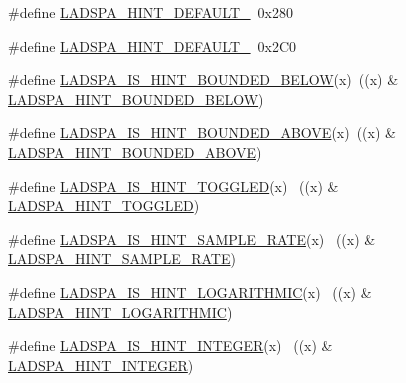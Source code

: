 \begin{DoxyCompactItemize}
\item 
\#define \hyperlink{win_2_l_a_d_s_p_a__plugins-win_2ladspa_8h_a0d369ce1f3e504c88a0160663a4e5e87}{L\+A\+D\+S\+P\+A\+\_\+\+H\+I\+N\+T\+\_\+\+D\+E\+F\+A\+U\+L\+T\+\_}~0x280
\item 
\#define \hyperlink{win_2_l_a_d_s_p_a__plugins-win_2ladspa_8h_a1aacf1e10f40b264ea253daee1fc4620}{L\+A\+D\+S\+P\+A\+\_\+\+H\+I\+N\+T\+\_\+\+D\+E\+F\+A\+U\+L\+T\+\_}~0x2\+C0
\item 
\#define \hyperlink{win_2_l_a_d_s_p_a__plugins-win_2ladspa_8h_a0e4a32c4e05f69be7e3d12e31b027a96}{L\+A\+D\+S\+P\+A\+\_\+\+I\+S\+\_\+\+H\+I\+N\+T\+\_\+\+B\+O\+U\+N\+D\+E\+D\+\_\+\+B\+E\+L\+OW}(x)~((x) \& \hyperlink{win_2_l_a_d_s_p_a__plugins-win_2ladspa_8h_af8ca1d953bcce70b7ccd6a7309486e16}{L\+A\+D\+S\+P\+A\+\_\+\+H\+I\+N\+T\+\_\+\+B\+O\+U\+N\+D\+E\+D\+\_\+\+B\+E\+L\+OW})
\item 
\#define \hyperlink{win_2_l_a_d_s_p_a__plugins-win_2ladspa_8h_a3296617ad301d15ef581ab3f388d9817}{L\+A\+D\+S\+P\+A\+\_\+\+I\+S\+\_\+\+H\+I\+N\+T\+\_\+\+B\+O\+U\+N\+D\+E\+D\+\_\+\+A\+B\+O\+VE}(x)~((x) \& \hyperlink{win_2_l_a_d_s_p_a__plugins-win_2ladspa_8h_a0e83a89c12f9695c1d69b741479f3391}{L\+A\+D\+S\+P\+A\+\_\+\+H\+I\+N\+T\+\_\+\+B\+O\+U\+N\+D\+E\+D\+\_\+\+A\+B\+O\+VE})
\item 
\#define \hyperlink{win_2_l_a_d_s_p_a__plugins-win_2ladspa_8h_a2b88235e91b6a058c6ad94028d61a4d4}{L\+A\+D\+S\+P\+A\+\_\+\+I\+S\+\_\+\+H\+I\+N\+T\+\_\+\+T\+O\+G\+G\+L\+ED}(x)          ~((x) \& \hyperlink{win_2_l_a_d_s_p_a__plugins-win_2ladspa_8h_aa1f5195cb6d7b8502af552ec48db6a47}{L\+A\+D\+S\+P\+A\+\_\+\+H\+I\+N\+T\+\_\+\+T\+O\+G\+G\+L\+ED})
\item 
\#define \hyperlink{win_2_l_a_d_s_p_a__plugins-win_2ladspa_8h_af34ad68bd55360f651c843dcc69ea329}{L\+A\+D\+S\+P\+A\+\_\+\+I\+S\+\_\+\+H\+I\+N\+T\+\_\+\+S\+A\+M\+P\+L\+E\+\_\+\+R\+A\+TE}(x)  ~((x) \& \hyperlink{win_2_l_a_d_s_p_a__plugins-win_2ladspa_8h_a184adf73da5ec410abfce239de960826}{L\+A\+D\+S\+P\+A\+\_\+\+H\+I\+N\+T\+\_\+\+S\+A\+M\+P\+L\+E\+\_\+\+R\+A\+TE})
\item 
\#define \hyperlink{win_2_l_a_d_s_p_a__plugins-win_2ladspa_8h_aec757797e9a28775de9bda84de01aade}{L\+A\+D\+S\+P\+A\+\_\+\+I\+S\+\_\+\+H\+I\+N\+T\+\_\+\+L\+O\+G\+A\+R\+I\+T\+H\+M\+IC}(x)  ~((x) \& \hyperlink{win_2_l_a_d_s_p_a__plugins-win_2ladspa_8h_a98bd5b7702b500dc6cad0fcfe02312a9}{L\+A\+D\+S\+P\+A\+\_\+\+H\+I\+N\+T\+\_\+\+L\+O\+G\+A\+R\+I\+T\+H\+M\+IC})
\item 
\#define \hyperlink{win_2_l_a_d_s_p_a__plugins-win_2ladspa_8h_adaa49764fd74c8849a131d1bda398386}{L\+A\+D\+S\+P\+A\+\_\+\+I\+S\+\_\+\+H\+I\+N\+T\+\_\+\+I\+N\+T\+E\+G\+ER}(x)          ~((x) \& \hyperlink{win_2_l_a_d_s_p_a__plugins-win_2ladspa_8h_a5bf65328a41d04440216bc932fe2bd16}{L\+A\+D\+S\+P\+A\+\_\+\+H\+I\+N\+T\+\_\+\+I\+N\+T\+E\+G\+ER})

\end{DoxyCompactItemize}
